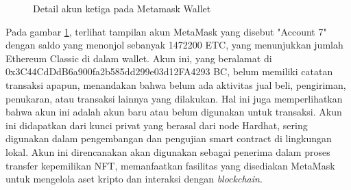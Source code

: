\begin{figure} [H] \centering
  \caption{Detail akun ketiga pada Metamask Wallet}
  \label{fig:detail_akun_3}
  \end{figure}

Pada gambar \ref*{fig:detail_akun_3}, terlihat tampilan akun MetaMask yang disebut "Account 7" dengan saldo yang menonjol sebanyak 1472200 ETC, yang menunjukkan jumlah Ethereum Classic di dalam wallet. Akun ini, yang beralamat di 0x3C44CdDdB6a900fa2b585dd299e03d12FA4293
BC, belum memiliki catatan transaksi apapun, menandakan bahwa belum ada aktivitas jual beli, pengiriman, penukaran, atau transaksi lainnya yang dilakukan. Hal ini juga memperlihatkan bahwa akun ini adalah akun baru atau belum digunakan untuk transaksi. Akun ini didapatkan dari kunci privat yang berasal dari node Hardhat, sering digunakan dalam pengembangan dan pengujian smart contract di lingkungan lokal. Akun ini direncanakan akan digunakan sebagai penerima dalam proses transfer kepemilikan NFT, memanfaatkan fasilitas yang disediakan MetaMask untuk mengelola aset kripto dan interaksi dengan \emph{blockchain}.

